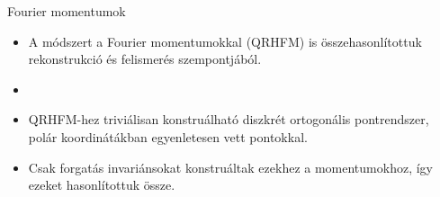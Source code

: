 \documentclass{beamer}
\begin{document}
\begin{frame}{Fourier momentumok}
    \begin{itemize}
    \item A módszert a Fourier momentumokkal (QRHFM) is összehasonlítottuk rekonstrukció és felismerés szempontjából.

    \item {}

    \item QRHFM-hez triviálisan konstruálható diszkrét ortogonális pontrendszer, polár koordinátákban egyenletesen vett pontokkal.

    \item Csak forgatás invariánsokat konstruáltak ezekhez a momentumokhoz, így ezeket hasonlítottuk össze.
    \end{itemize}
\end{frame}
\end{document}
